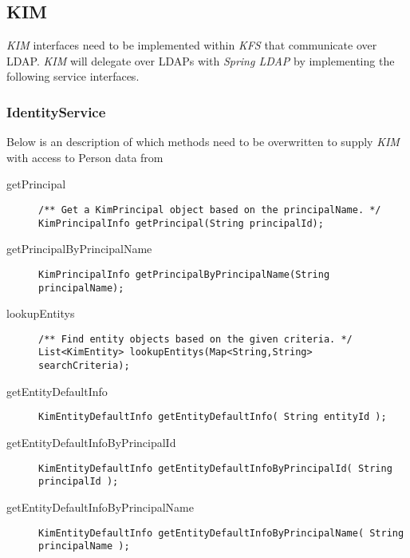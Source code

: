 \documentclass[12pt,notitlepage]{article}
\begin{document}
\subsection{KIM}
\emph{KIM} interfaces need to be implemented within \emph{KFS} that communicate over LDAP. \emph{KIM}
will delegate over LDAPs with \emph{Spring LDAP} by implementing the following service interfaces.

\subsubsection{IdentityService}
Below is an description of which methods need to be overwritten to supply \emph{KIM} with access to Person data from
\begin{description}
  \item [getPrincipal]
\begin{lstlisting}
/** Get a KimPrincipal object based on the principalName. */
KimPrincipalInfo getPrincipal(String principalId);
\end{lstlisting}

\item[getPrincipalByPrincipalName]
\begin{lstlisting}
KimPrincipalInfo getPrincipalByPrincipalName(String principalName);
\end{lstlisting}

\item[lookupEntitys]
\begin{lstlisting}
/** Find entity objects based on the given criteria. */
List<KimEntity> lookupEntitys(Map<String,String> searchCriteria);
\end{lstlisting}

\item[getEntityDefaultInfo]
\begin{lstlisting}
KimEntityDefaultInfo getEntityDefaultInfo( String entityId );
\end{lstlisting}

\item[getEntityDefaultInfoByPrincipalId]
\begin{lstlisting}
KimEntityDefaultInfo getEntityDefaultInfoByPrincipalId( String principalId );
\end{lstlisting}

\item[getEntityDefaultInfoByPrincipalName]
\begin{lstlisting}
KimEntityDefaultInfo getEntityDefaultInfoByPrincipalName( String principalName );
\end{lstlisting}


\end{description}
\end{document}

